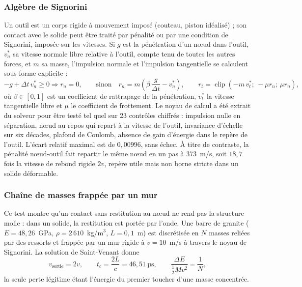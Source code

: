 \subsubsection{Algèbre de Signorini}

Un outil est un corps rigide à mouvement imposé (couteau, piston idéalisé) ; son contact avec le solide peut être traité par pénalité ou par une condition de Signorini, imposée sur les vitesses. Si $g$ est la pénétration d'un nœud dans l'outil, $v_n^*$ sa vitesse normale libre relative à l'outil, compte tenu de toutes les autres forces, et $m$ sa masse, l'impulsion normale et l'impulsion tangentielle se calculent sous forme explicite :
\begin{equation}
-g + \Delta t\,v_n^* \geq 0 \Rightarrow r_n = 0, \qquad \text{sinon} \quad
r_n = m\left(\beta\,\frac{g}{\Delta t} - v_n^*\right), \qquad
r_t = \operatorname{clip}\left(-m\,v_t^*;\ -\mu r_n;\ \mu r_n\right),
\label{eq-signorini}
\end{equation}
où $\beta \in [0, 1]$ est un coefficient de rattrapage de la pénétration, $v_t^*$ la vitesse tangentielle libre et $\mu$ le coefficient de frottement. Le noyau de calcul a été extrait du solveur pour être testé tel quel sur 23 contrôles chiffrés : impulsion nulle en séparation, nœud au repos qui repart à la vitesse de l'outil, invariance d'échelle sur six décades, plafond de Coulomb, absence de gain d'énergie dans le repère de l'outil. L'écart relatif maximal est de $0{,}00996$, sans échec. À titre de contraste, la pénalité nœud-outil fait repartir le même nœud en un pas à 373~m/s, soit $18{,}7$ fois la vitesse de rebond rigide $2v$, repère utile mais non borne stricte dans un solide déformable.

\subsubsection{Chaîne de masses frappée par un mur}

Ce test montre qu'un contact sans restitution au nœud ne rend pas la structure molle : dans un solide, la restitution est portée par l'onde. Une barre de granite ($E = 48{,}26$~GPa, $\rho = 2\,610$~kg/m$^3$, $L = 0{,}1$~m) est discrétisée en $N$ masses reliées par des ressorts et frappée par un mur rigide à $v = 10$~m/s à travers le noyau de Signorini. La solution de Saint-Venant donne
\begin{equation}
v_\text{sortie} = 2v, \qquad t_c = \frac{2L}{c} = 46{,}51~\text{µs}, \qquad \frac{\Delta E}{\frac12 M v^2} = \frac1N ,
\end{equation}
la seule perte légitime étant l'énergie du premier toucher d'une masse concentrée.

